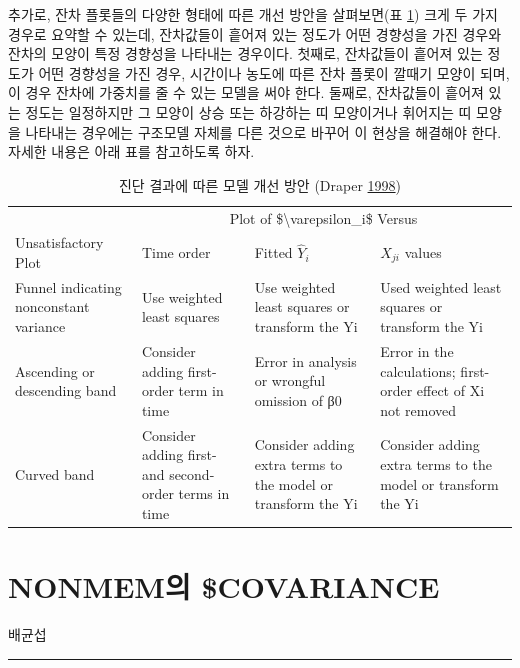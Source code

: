 \documentclass[
  10pt,
  krantz2,
  a4paper]{krantz}
\theoremstyle{definition}
\theoremstyle{definition}
\theoremstyle{definition}
\theoremstyle{remark}
\begin{document}
추가로, 잔차 플롯들의 다양한 형태에 따른 개선 방안을 살펴보면(표 \ref{tab:diag-response}) 크게 두 가지 경우로 요약할 수 있는데, 잔차값들이 흩어져 있는 정도가 어떤 경향성을 가진 경우와 잔차의 모양이 특정 경향성을 나타내는 경우이다. 첫째로, 잔차값들이 흩어져 있는 정도가 어떤 경향성을 가진 경우, 시간이나 농도에 따른 잔차 플롯이 깔때기 모양이 되며, 이 경우 잔차에 가중치를 줄 수 있는 모델을 써야 한다. 둘째로, 잔차값들이 흩어져 있는 정도는 일정하지만 그 모양이 상승 또는 하강하는 띠 모양이거나 휘어지는 띠 모양을 나타내는 경우에는 구조모델 자체를 다른 것으로 바꾸어 이 현상을 해결해야 한다. 자세한 내용은 아래 표를 참고하도록 하자.

\begin{table}

\caption{\label{tab:diag-response}진단 결과에 따른 모델 개선 방안 (Draper \protect\hyperlink{ref-draper1998applied}{1998})}
\centering
\begin{tabular}[t]{llll}
\toprule
\multicolumn{1}{c}{ } & \multicolumn{3}{c}{Plot of \$\textbackslash{}varepsilon\_i\$ Versus} \\
\cmidrule(l{3pt}r{3pt}){2-4}
Unsatisfactory Plot & Time order & Fitted $\hat{Y}_i$ & $X_{ji}$ values\\
\midrule
Funnel indicating nonconstant variance & Use weighted least squares & Use weighted least squares or transform the Yi & Used weighted least squares or transform the Yi\\
Ascending or descending band & Consider adding first-order term in time & Error in analysis or wrongful omission of β0 & Error in the calculations; first-order effect of Xi not removed\\
Curved band & Consider adding first- and second- order terms in time & Consider adding extra terms to the model or transform the Yi & Consider adding extra terms to the model or transform the Yi\\
\bottomrule
\end{tabular}
\end{table}



\hypertarget{cov}{%
\chapter{NONMEM의 \$COVARIANCE}\label{cov}}

배균섭

\begin{center}\rule{0.5\linewidth}{0.5pt}\end{center}
\end{document}
